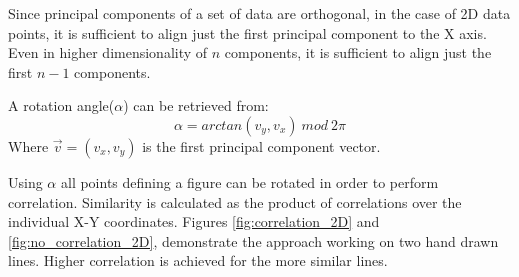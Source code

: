 \documentclass[
    floatsintext
]{article}
\begin{document}
Since principal components of a set of data are orthogonal, in the case of 2D data points, it is sufficient to align just the first principal component to the X axis.
Even in higher dimensionality of $n$ components, it is sufficient to align just the first $n-1$ components.

A rotation angle($\alpha$) can be retrieved from:
\begin{equation*}
\alpha = arctan(v_y,v_x)\ mod\ 2\pi 
\end{equation*}
Where $\vec{v}=(v_x,v_y)$ is the first principal component vector.

Using $\alpha$ all points defining a figure can be rotated in order to perform correlation. 
Similarity is calculated as the product of correlations over the individual X-Y coordinates.
Figures \ref{fig:correlation_2D} and \ref{fig:no_correlation_2D}, demonstrate the approach working on two hand drawn lines. 
Higher correlation is achieved for the more similar lines. 
\end{document}
